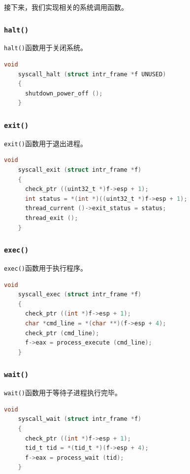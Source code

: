 \documentclass{article}
\begin{document}
接下来，我们实现相关的系统调用函数。

\subsubsection{\texttt{halt()}}

\texttt{halt()}函数用于关闭系统。

\begin{lstlisting}[language=C, title=\texttt{src/userprog/syscall.c - syscall\_halt()}]
    void
    syscall_halt (struct intr_frame *f UNUSED)
    {
      shutdown_power_off ();
    }
\end{lstlisting}

\subsubsection{\texttt{exit()}}

\texttt{exit()}函数用于退出进程。

\begin{lstlisting}[language=C, title=\texttt{src/userprog/syscall.c - syscall\_exit()}]
    void
    syscall_exit (struct intr_frame *f)
    {
      check_ptr ((uint32_t *)f->esp + 1);
      int status = *(int *)((uint32_t *)f->esp + 1);
      thread_current ()->exit_status = status;
      thread_exit ();
    }
\end{lstlisting}

\subsubsection{\texttt{exec()}}

\texttt{exec()}函数用于执行程序。

\begin{lstlisting}[language=C, title=\texttt{src/userprog/syscall.c - syscall\_exec()}]
    void
    syscall_exec (struct intr_frame *f)
    {
      check_ptr ((int *)f->esp + 1);
      char *cmd_line = *(char **)(f->esp + 4);
      check_ptr (cmd_line);
      f->eax = process_execute (cmd_line);
    }
\end{lstlisting}

\subsubsection{\texttt{wait()}}

\texttt{wait()}函数用于等待子进程执行完毕。

\begin{lstlisting}[language=C, title=\texttt{src/userprog/syscall.c - syscall\_wait()}]
    void
    syscall_wait (struct intr_frame *f)
    {
      check_ptr ((int *)f->esp + 1);
      tid_t tid = *(tid_t *)(f->esp + 4);
      f->eax = process_wait (tid);
    }
\end{lstlisting}
\end{document}
